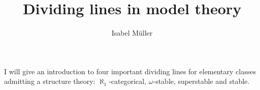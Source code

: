 \documentclass{amsart}
\title{Dividing lines in model theory}
\author{Isabel M\"uller}
\begin{document}
\maketitle
I will give an introduction to four important dividing lines for elementary classes admitting a structure theory: $\aleph_1$-categorical, $\omega$-stable, superstable and stable. 
\end{document}

